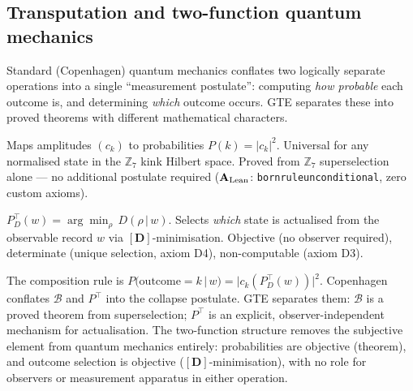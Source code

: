 \documentclass[11pt]{article}
\theoremstyle{remark}
\newcommand{\ZS}{\mathbb{Z}_7}
\newcommand{\lean}[1]{%
  \penalty-100
  \begingroup\def\_{\textunderscore\allowbreak}\texttt{#1}\endgroup}
\newcommand{\CatAL}{\ensuremath{\textbf{A}_{\rm Lean}}}
\begin{document}
\subsection{Transputation and two-function quantum mechanics}

Standard (Copenhagen) quantum mechanics conflates two logically separate
operations into a single ``measurement postulate'': computing \emph{how
probable} each outcome is, and determining \emph{which} outcome occurs.
GTE separates these into proved theorems with different mathematical characters.

\begin{description}[leftmargin=3cm,labelwidth=3cm]
\item[\textit{Born rule $\mathcal{B}$}]
  Maps amplitudes $(c_k)$ to probabilities $P(k) = |c_k|^2$.
  Universal for any normalised state in the $\ZS$ kink Hilbert space.
  Proved from $\ZS$ superselection alone — no additional postulate required
  ($\CatAL$: \lean{born\_rule\_unconditional}, zero custom axioms).
\item[\textit{Transputation $P^\top$}]
  $P^\top_D(w) = \arg\min_\rho\, D(\rho\,|\,w)$.
  Selects \emph{which} state is actualised from the observable record $w$ via
  $[\mathbf{D}]$-minimisation.  Objective (no observer required), determinate
  (unique selection, axiom D4), non-computable (axiom D3).
\end{description}

The composition rule is $P(\text{outcome}=k\,|\,w) = |c_k(P^\top_D(w))|^2$.
Copenhagen conflates $\mathcal{B}$ and $P^\top$ into the collapse postulate.
GTE separates them: $\mathcal{B}$ is a proved theorem from superselection;
$P^\top$ is an explicit, observer-independent mechanism for actualisation.
The two-function structure removes the subjective element from quantum mechanics
entirely: probabilities are objective (theorem), and outcome selection is
objective ($[\mathbf{D}]$-minimisation), with no role for observers or
measurement apparatus in either operation.
\end{document}

